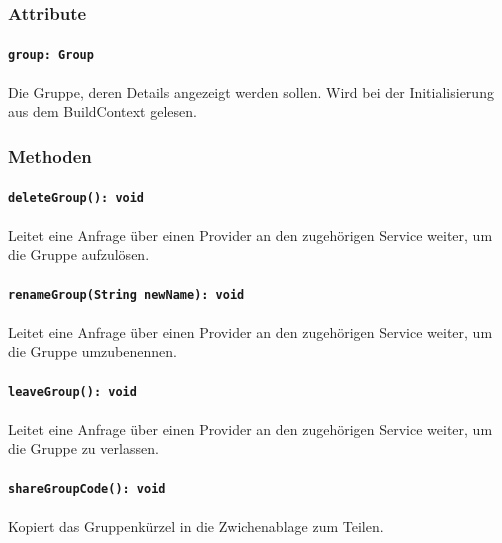 \documentclass{entwurfsheft}
\begin{document}
\subsubsection*{Attribute}
\paragraph{\texttt{group: Group}}
Die Gruppe, deren Details angezeigt werden sollen. Wird bei der Initialisierung aus dem \Gls{BuildContext} gelesen.
\subsubsection*{Methoden}
\paragraph{\texttt{deleteGroup(): void}}
Leitet eine Anfrage über einen Provider an den zugehörigen Service weiter, um die Gruppe aufzulösen.
\paragraph{\texttt{renameGroup(String newName): void}}
Leitet eine Anfrage über einen Provider an den zugehörigen Service weiter, um die Gruppe umzubenennen.
\paragraph{\texttt{leaveGroup(): void}}
Leitet eine Anfrage über einen Provider an den zugehörigen Service weiter, um die Gruppe zu verlassen.
\paragraph{\texttt{shareGroupCode(): void}}
Kopiert das Gruppenkürzel in die Zwichenablage zum Teilen.
\newpage
\end{document}
